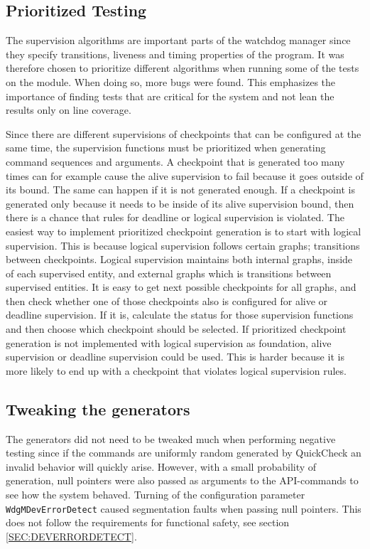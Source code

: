 \subsection{Prioritized Testing}
The supervision algorithms are important parts of the watchdog manager
since they specify transitions, liveness and timing properties of the
program. It was therefore chosen to prioritize different algorithms
when running some of the tests on the module. When doing so, more bugs
were found. This emphasizes the importance of finding tests that are
critical for the system and not lean the results only on line
coverage.

Since there are different supervisions of checkpoints that can be
configured at the same time, the supervision functions must be
prioritized when generating command sequences and arguments. A
checkpoint that is generated too many times can for example cause the
alive supervision to fail because it goes outside of its bound. The
same can happen if it is not generated enough. If a checkpoint is
generated only because it needs to be inside of its alive supervision
bound, then there is a chance that rules for deadline or logical
supervision is violated. The easiest way to implement prioritized
checkpoint generation is to start with logical supervision. This is
because logical supervision follows certain graphs; transitions
between checkpoints. Logical supervision maintains both internal
graphs, inside of each supervised entity, and external graphs which is
transitions between supervised entities. It is easy to get next
possible checkpoints for all graphs, and then check whether one of
those checkpoints also is configured for alive or deadline
supervision. If it is, calculate the status for those supervision
functions and then choose which checkpoint should be selected.
If prioritized checkpoint generation is not implemented with logical
supervision as foundation, alive supervision or deadline supervision
could be used. This is harder because it is more likely to end up with
a checkpoint that violates logical supervision rules.

\subsection{Tweaking the generators}
The generators did not need to be tweaked much when performing
negative testing since if the commands are uniformly random generated
by QuickCheck an invalid behavior will quickly arise. However, with a
small probability of generation, null pointers were also passed as
arguments to the API-commands to see how the system behaved. Turning
of the configuration parameter \lstinline!WdgMDevErrorDetect! caused
segmentation faults when passing null pointers. This does not follow
the requirements for functional safety, see section
\ref{SEC:DEVERRORDETECT}.

